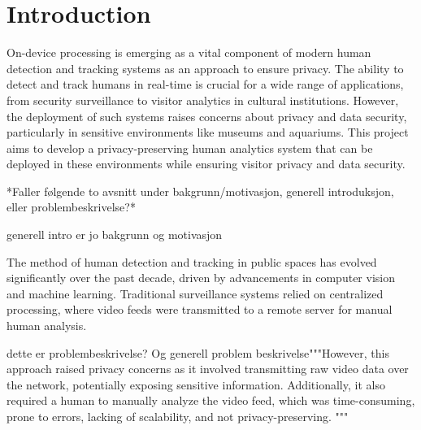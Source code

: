 




\section{Introduction} 
On-device processing is emerging as a vital component of modern human detection and tracking systems as an approach to ensure privacy. The ability to detect and track humans in real-time is crucial for a wide range of applications, from security surveillance to visitor analytics in cultural institutions. However, the deployment of such systems raises concerns about privacy and data security, particularly in sensitive environments like museums and aquariums. This project aims to develop a privacy-preserving human analytics system that can be deployed in these environments while ensuring visitor privacy and data security.

*Faller følgende to avsnitt under bakgrunn/motivasjon, generell introduksjon, eller problembeskrivelse?*

generell intro er jo bakgrunn og motivasjon

The method of human detection and tracking in public spaces has evolved significantly over the past decade, driven by advancements in computer vision and machine learning. Traditional surveillance systems relied on centralized processing, where video feeds were transmitted to a remote server for manual human analysis. 

dette er problembeskrivelse? Og generell problem beskrivelse"""However, this approach raised privacy concerns as it involved transmitting raw video data over the network, potentially exposing sensitive information. Additionally, it also required a human to manually analyze the video feed, which was time-consuming, prone to errors, lacking of scalability, and not privacy-preserving. """

